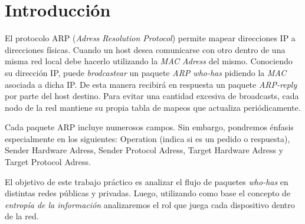 \section{Introducci\'on}

El protocolo ARP (\emph{Adress Resolution Protocol}) permite mapear direcciones
IP a direcciones físicas. Cuando un host desea comunicarse con otro dentro de
una misma red local debe hacerlo utilizando la \emph{MAC Adress} del mismo.
Conociendo su dirección IP, puede \emph{brodcastear} un paquete 
\emph{ARP who-has} pidiendo la \emph{MAC} asociada a dicha IP. De esta manera
recibirá en respuesta un paquete \emph{ARP-reply} por parte del host destino.
Para evitar una cantidad excesiva de broadcasts, cada nodo de la red mantiene
su propia tabla de mapeos que actualiza peri\'odicamente.

Cada paquete ARP incluye numerosos campos. Sin embargo, pondremos énfasis 
especialmente en los siguientes: Operation (indica si es un pedido o respuesta),
Sender Hardware Adress, Sender Protocol Adress, Target Hardware Adress y 
Target Protocol Adress. 

El objetivo de este trabajo práctico es analizar el flujo de paquetes 
\emph{who-has} en distintas redes p\'ublicas y privadas. Luego, utilizando
como base el concepto de \textit{entrop\'ia de la informaci\'on} analizaremos el
rol que juega cada dispositivo dentro de la red.
